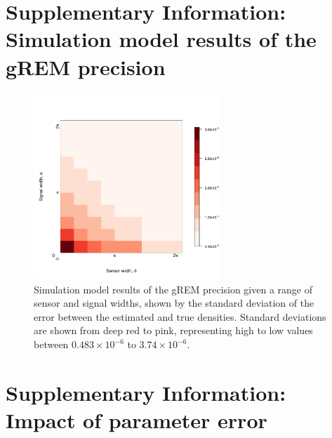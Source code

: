 

\vspace{1cm}




\clearpage
\section{Supplementary Information: Simulation model results of the gREM precision}
\setcounter{figure}{0}    

\begin{figure}[h!]
	\includegraphics[width=7cm]{imgs/ResultStandardDeviation.pdf}
	\caption[gREM precision given a range of sensor and signal widths]{
Simulation model results of the gREM precision given a range of sensor and signal widths, shown by the standard deviation of the error between the estimated and true densities. 
Standard deviations are shown from deep red to pink, representing high to low values between $0.483\times10^{-6}$ to $3.74\times10^{-6}$. 
        } 
	\label{f:StandardDeviation}
\end{figure}


\clearpage
\section{Supplementary Information: Impact of parameter error}
\setcounter{figure}{0}    




